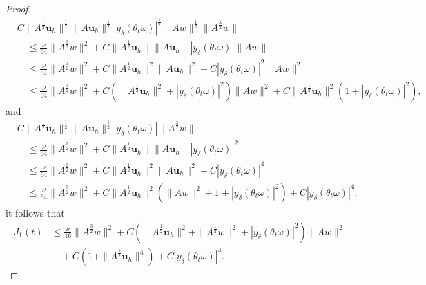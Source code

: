 \documentclass[10pt,a4paper]{amsart}
\begin{document}
\begin{proof}
\begin{align*}
  &C\|A^\frac12\textbf{u}_h\|^\frac12\|A\textbf{u}_h\|^\frac12 |y_\delta(\theta_t\omega)|^\frac12
\|Aw\|^\frac12\|A^\frac32w\|
& \nonumber\\
&\quad  \leq    \frac \nu {64} \|A^\frac32w\|^2  + C \|A^\frac12\textbf{u}_h\|  \|A \textbf{u}_h\|  |y_\delta(\theta_t\omega) |  \|Aw\|
\nonumber
\\
&\quad \leq     \frac \nu {64}\|A^\frac32w\|^2
+ C \|A^\frac12\textbf{u}_h\|^2  \|A \textbf{u}_h\|^2+    C| y_\delta(\theta_t\omega)|^2 \|Aw\|^2
\nonumber
\\
&\quad \leq     \frac \nu {64}\|A^\frac32w\|^2
+ C\left( \|A^\frac12\textbf{u}_h\|^2 +  |y_\delta(\theta_t\omega)|^2  \right) \|A w\|^2
+ C  \|A^\frac12\textbf{u}_h\|^2   \left(  1+ |y_\delta(\theta_t\omega) |^2  \right) ,
\end{align*}
and
\begin{align*}
  &C\|A^\frac12\textbf{u}_h\|^\frac12\|A\textbf{u}_h\|^\frac12 | y_\delta(\theta_t\omega)|  \|A^\frac32w\|
& \nonumber\\
&\quad \leq     \frac \nu {64}\|A^\frac32w\|^2  + C \|A^\frac12\textbf{u}_h\| \|A \textbf{u}_h\|   |y_\delta(\theta_t\omega)|^2
\nonumber
\\
&\quad \leq    \frac \nu {64}\|A^\frac32w\|^2
+ C \|A^\frac12\textbf{u}_h\|^2  \|A \textbf{u}_h\|^2   + C|y_\delta(\theta_t\omega) |^4
\nonumber
\\
&\quad \leq   \frac \nu {64}\|A^\frac32w\|^2
+ C  \|A^\frac12\textbf{u}_h\|^2     \left(  \|A w\|^2  +1+|y_\delta(\theta_t\omega) |^2  \right)
+ C|y_\delta(\theta_t\omega) |^4 ,
\end{align*}
it follows that
\begin{align}
J_1(t)
&\leq \frac  \nu {16}\|A^\frac32w\|^2
+C\left(\|A^\frac12\textbf{u}_h\|^2+\|A^\frac12w\|^2+|y_\delta(\theta_t\omega)|^2 \right)
\|Aw\|^2\nonumber\\
&\quad +C\left(1+\|A^\frac12\textbf{u}_h\|^4 \right)+C   |y_\delta(\theta_t\omega)|^4 .
\nonumber
\end{align}


\end{proof}
\end{document}
